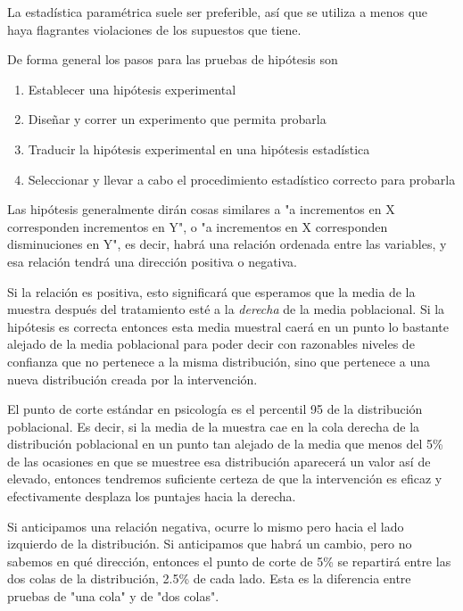 \documentclass[a4paper,12pt]{article}
\begin{document}
La estadística paramétrica suele ser preferible, así que se utiliza a menos que haya flagrantes violaciones de los supuestos que tiene.

De forma general los pasos para las pruebas de hipótesis son
\begin{enumerate}
  \item Establecer una hipótesis experimental
  \item Diseñar y correr un experimento que permita probarla
  \item Traducir la hipótesis experimental en una hipótesis estadística
  \item Seleccionar y llevar a cabo el procedimiento estadístico correcto para probarla
\end{enumerate}

Las hipótesis generalmente dirán cosas similares a "a incrementos en X corresponden incrementos en Y", o "a incrementos en X corresponden disminuciones en Y", es decir, habrá una relación ordenada entre las variables, y esa relación tendrá una dirección positiva o negativa.

Si la relación es positiva, esto significará que esperamos que la media de la muestra después del tratamiento esté a la {\slshape derecha} de la media poblacional. Si la hipótesis es correcta entonces esta media muestral caerá en un punto lo bastante alejado de la media poblacional para poder decir con razonables niveles de confianza que no pertenece a la misma distribución, sino que pertenece a una nueva distribución creada por la intervención.

El punto de corte estándar en psicología es el percentil 95 de la distribución poblacional. Es decir, si la media de la muestra cae en la cola derecha de la distribución poblacional en un punto tan alejado de la media que menos del 5\% de las ocasiones en que se muestree esa distribución aparecerá un valor así de elevado, entonces tendremos suficiente certeza de que la intervención es eficaz y efectivamente desplaza los puntajes hacia la derecha.

Si anticipamos una relación negativa, ocurre lo mismo pero hacia el lado izquierdo de la distribución. Si anticipamos que habrá un cambio, pero no sabemos en qué dirección, entonces el punto de corte de 5\% se repartirá entre las dos colas de la distribución, 2.5\% de cada lado. Esta es la diferencia entre pruebas de "una cola" y de "dos colas".

\end{document}
